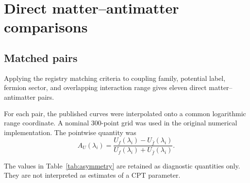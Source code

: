 \documentclass[aps,prd,reprint,superscriptaddress,nofootinbib]{revtex4-2}
\begin{document}
	\section{Direct matter--antimatter comparisons}
	
	\subsection{Matched pairs}
	
	Applying the registry matching criteria to coupling family, potential
	label, fermion sector, and overlapping interaction range gives eleven
	direct matter--antimatter pairs.
	
	For each pair, the published curves were interpolated onto a common
	logarithmic range coordinate. A nominal 300-point grid was used in the
	original numerical implementation. The pointwise quantity was
	\begin{equation}
		A_U(\lambda_i)
		=
		\frac{
			U_f(\lambda_i)-U_{\bar f}(\lambda_i)
		}{
			U_f(\lambda_i)+U_{\bar f}(\lambda_i)
		}.
		\label{eq:AUlambda}
	\end{equation}
	
	The values in Table~\ref{tab:asymmetry} are retained as diagnostic
	quantities only. They are not interpreted as estimates of a CPT
	parameter.
	
\end{document}
